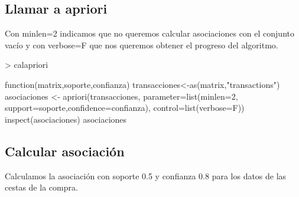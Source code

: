 \documentclass [a4paper] {article}
\begin{document}
\subsection{Llamar a apriori}
Con minlen=2 indicamos que no queremos calcular asociaciones con el conjunto vacío y con verbose=F que nos queremos obtener el progreso del algoritmo.
\begin{Schunk}
\begin{Sinput}
> calapriori
\end{Sinput}
\begin{Soutput}
function(matrix,soporte,confianza){
    transacciones<-as(matrix,"transactions")
    asociaciones <- apriori(transacciones, 
        parameter=list(minlen=2, support=soporte,confidence=confianza), 
        control=list(verbose=F))
    inspect(asociaciones)
    asociaciones
}
\end{Soutput}
\end{Schunk}

\subsection{Calcular asociación}
Calculamos la asociación con soporte 0.5 y confianza 0.8 para los datos de las cestas de la compra.
\end{document}
